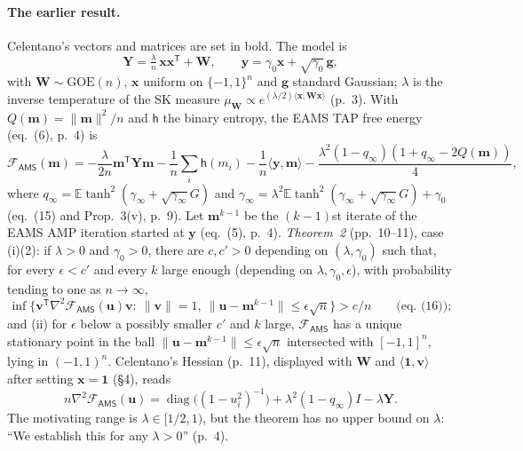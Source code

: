 \documentclass[11pt]{article}
\newcommand{\E}{\mathbb{E}}
\newcommand{\norm}[1]{\lVert #1\rVert}
\newcommand{\ip}[2]{\langle #1,#2\rangle}
\newcommand{\sloc}[2]{\cite[#2]{#1}}
\begin{document}
\paragraph{The earlier result.}
Celentano's vectors and matrices are set in bold. The model
\sloc{Celentano2022-SudakovFerniquePostAMPTAPConvexity}{(1)--(2), p.~2} is
\[
 \mathbf Y=\tfrac\lambda n\,\mathbf x\mathbf x^{\mathsf T}+\mathbf W,\qquad
 \mathbf y=\gamma_0\mathbf x+\sqrt{\gamma_0}\,\mathbf g,
\]
with $\mathbf W\sim\mathrm{GOE}(n)$, $\mathbf x$ uniform on $\{-1,1\}^n$ and
$\mathbf g$ standard Gaussian; $\lambda$ is the inverse temperature of the SK
measure $\mu_{\mathbf W}\propto e^{(\lambda/2)\ip{\mathbf x}{\mathbf W\mathbf x}}$
(p.~3). With $Q(\mathbf m)=\norm{\mathbf m}^2/n$ and $\mathsf h$ the binary
entropy, the EAMS TAP free energy (eq.~(6), p.~4) is
\[
 \mathcal F_{\mathsf{AMS}}(\mathbf m)=-\frac\lambda{2n}\mathbf m^{\mathsf T}\mathbf Y\mathbf m
 -\frac1n\sum_i\mathsf h(m_i)-\frac1n\ip{\mathbf y}{\mathbf m}
 -\frac{\lambda^2(1-q_\infty)(1+q_\infty-2Q(\mathbf m))}4,
\]
where $q_\infty=\E\tanh^2(\gamma_\infty+\sqrt{\gamma_\infty}G)$ and
$\gamma_\infty=\lambda^2\E\tanh^2(\gamma_\infty+\sqrt{\gamma_\infty}G)+\gamma_0$
(eq.~(15) and Prop.~3(v), p.~9). Let $\mathbf m^{k-1}$ be the $(k-1)$st iterate
of the EAMS AMP iteration started at $\mathbf y$ (eq.~(5), p.~4).
\emph{Theorem~2} (pp.~10--11), case (i)(2): if $\lambda>0$ and $\gamma_0>0$,
there are $c,c'>0$ depending on $(\lambda,\gamma_0)$ such that, for every
$\epsilon<c'$ and every $k$ large enough (depending on $\lambda,\gamma_0,\epsilon$),
with probability tending to one as $n\to\infty$,
\[
 \inf\bigl\{\mathbf v^{\mathsf T}\nabla^2\mathcal F_{\mathsf{AMS}}(\mathbf u)\mathbf v:\
 \norm{\mathbf v}=1,\ \norm{\mathbf u-\mathbf m^{k-1}}\le\epsilon\sqrt n\bigr\}>c/n
 \qquad\text{(eq.~(16))};
\]
and (ii) for $\epsilon$ below a possibly smaller $c'$ and $k$ large,
$\mathcal F_{\mathsf{AMS}}$ has a unique stationary point in the ball
$\norm{\mathbf u-\mathbf m^{k-1}}\le\epsilon\sqrt n$ intersected with
$[-1,1]^n$, lying in $(-1,1)^n$. Celentano's Hessian (p.~11), displayed with
$\mathbf W$ and $\ip{\mathbf 1}{\mathbf v}$ after setting $\mathbf x=\mathbf 1$
(\S4), reads
\[
 n\nabla^2\mathcal F_{\mathsf{AMS}}(\mathbf u)=\operatorname{diag}\bigl((1-u_i^2)^{-1}\bigr)
 +\lambda^2(1-q_\infty)I-\lambda\mathbf Y .
\]
The motivating range is $\lambda\in[1/2,1)$, but the theorem has no upper
bound on $\lambda$: ``We establish this for any $\lambda>0$'' (p.~4).
\end{document}
